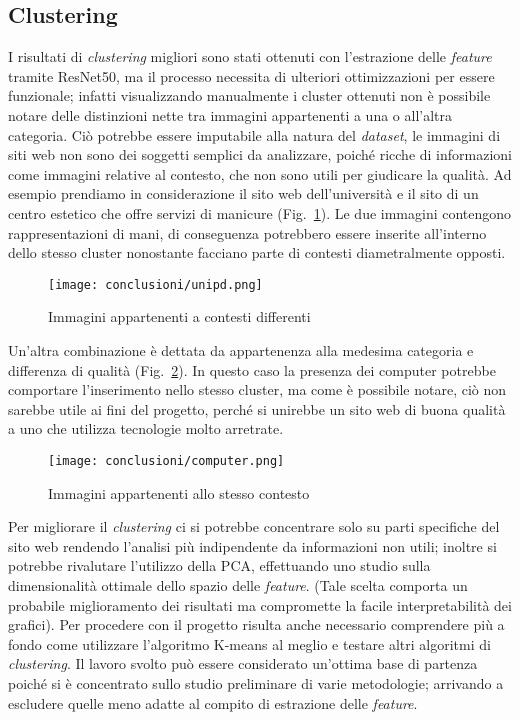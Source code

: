 \newpage 

\subsection{Clustering}
I risultati di \emph{clustering} migliori sono stati ottenuti con l'estrazione delle \emph{feature} tramite ResNet50, ma il processo necessita di ulteriori ottimizzazioni per essere funzionale;
infatti visualizzando manualmente i cluster ottenuti non è possibile notare delle distinzioni nette tra immagini appartenenti a una o all'altra categoria. Ciò potrebbe essere imputabile alla natura del \emph{dataset}, le immagini di siti web non sono dei soggetti semplici da analizzare, poiché ricche di informazioni come immagini relative al contesto, che non sono utili per giudicare la qualità.
Ad esempio prendiamo in considerazione il sito web dell'università e il sito di un centro estetico che offre servizi di manicure (Fig.~\ref{fig:unipd-conc}).
Le due immagini contengono rappresentazioni di mani, di conseguenza potrebbero essere inserite all'interno dello stesso cluster nonostante facciano parte di contesti diametralmente opposti.
\begin{figure}[!h] 
    \centering 
    \texttt{[image: conclusioni/unipd.png]} 
    \caption{Immagini appartenenti a contesti differenti}
    \label{fig:unipd-conc}
  \end{figure}

\newpage
Un'altra combinazione è dettata da appartenenza alla medesima categoria e differenza di qualità (Fig.~\ref{fig:computer-conc}).
In questo caso la presenza dei computer potrebbe comportare l'inserimento nello stesso cluster, ma come è possibile notare, ciò non sarebbe utile ai fini del progetto, perché si unirebbe un sito web di buona qualità a uno che utilizza tecnologie molto arretrate.

\begin{figure}[!h] 
    \centering 
    \texttt{[image: conclusioni/computer.png]} 
    \caption{Immagini appartenenti allo stesso contesto}
    \label{fig:computer-conc}
  \end{figure}

Per migliorare il \emph{clustering} ci si potrebbe concentrare solo su parti specifiche del sito web rendendo l'analisi più indipendente da informazioni non utili; inoltre si potrebbe rivalutare l'utilizzo della PCA, effettuando uno studio sulla dimensionalità ottimale dello spazio delle \emph{feature}. (Tale scelta comporta un probabile miglioramento dei risultati ma compromette la facile interpretabilità dei grafici).
Per procedere con il progetto risulta anche necessario comprendere più a fondo come utilizzare l'algoritmo K-means al meglio e testare altri algoritmi di \emph{clustering}.
Il lavoro svolto può essere considerato un'ottima base di partenza poiché si è concentrato sullo studio preliminare di varie metodologie; arrivando a escludere quelle meno adatte al compito di estrazione delle \emph{feature}.

